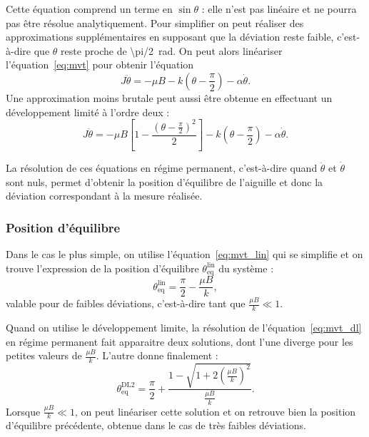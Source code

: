 \documentclass[12pt,a4paper,fleqn]{article}
\newcommand{\cad}{c'est-à-dire}
\begin{document}
Cette équation comprend un terme en $\sin\theta$ : elle n'est pas linéaire et ne pourra pas être résolue analytiquement.
Pour simplifier on peut réaliser des approximations supplémentaires en supposant que la déviation reste faible, \cad{} que $\theta$ reste \og proche \fg{} de \SI{\pi/2}{\radian}.
On peut alors linéariser l'équation~\ref{eq:mvt} pour obtenir l'équation
\begin{equation}
    J\ddot{\theta} = -\mu B - k\left(\theta-\frac{\pi}{2}\right) - \alpha\dot{\theta}.
    \label{eq:mvt_lin}
\end{equation}
Une approximation moins brutale peut aussi être obtenue en effectuant un développement limité à l'ordre deux :
\begin{equation}
    J\ddot{\theta} = - \mu B \left[ 1-\frac{\left(\theta-\frac{\pi}{2}\right)^2}{2} \right] - k\left(\theta-\frac{\pi}{2}\right) - \alpha\dot{\theta}.
    \label{eq:mvt_dl}
\end{equation}

La résolution de ces équations en régime permanent, \cad{} quand $\ddot{\theta}$ et $\dot{\theta}$ sont nuls, permet d'obtenir la position d'équilibre de l'aiguille et donc la déviation correspondant à la mesure réalisée.

\subsubsection{Position d'équilibre}

Dans le cas le plus simple, on utilise l'équation~\ref{eq:mvt_lin} qui se simplifie et on trouve l'expression de la position d'équilibre $\theta_\mathrm{eq}^\mathrm{lin}$ du système :
\begin{equation}
    \theta_\mathrm{eq}^\mathrm{lin} = \frac{\pi}{2} - \frac{\mu B}{k},
    \label{eq:sol_lin}
\end{equation}
valable pour de faibles déviations, \cad{} tant que $\frac{\mu B}{k} \ll 1$.

Quand on utilise le développement limite, la résolution de l'équation~\ref{eq:mvt_dl} en régime permanent fait apparaitre deux solutions, dont l'une diverge pour les petites valeurs de $\tfrac{\mu B}{k}$.
L'autre donne finalement :
\begin{equation}
    \theta_\mathrm{eq}^\mathrm{DL2} = \frac{\pi}{2} + \frac{1-\sqrt{1+2\left(\frac{\mu B}{k}\right)^2}}{\frac{\mu B}{k}}.
    \label{eq:sol_dl}
\end{equation}
Lorsque $\frac{\mu B}{k} \ll 1$, on peut linéariser cette solution et on retrouve bien la position d'équilibre précédente, obtenue dans le cas de très faibles déviations.
\end{document}
